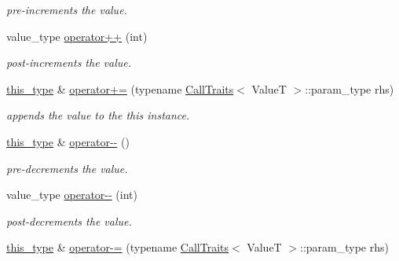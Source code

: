 \begin{DoxyCompactItemize}
\begin{DoxyCompactList}\small\item\em pre-\/increments the value. \end{DoxyCompactList}\item 
\hypertarget{classhryky_1_1exclusion_1_1_atomic_a5c6f6492d00d72e7a521197b81ffe4f4}{value\-\_\-type \hyperlink{classhryky_1_1exclusion_1_1_atomic_a5c6f6492d00d72e7a521197b81ffe4f4}{operator++} (int)}\label{classhryky_1_1exclusion_1_1_atomic_a5c6f6492d00d72e7a521197b81ffe4f4}

\begin{DoxyCompactList}\small\item\em post-\/increments the value. \end{DoxyCompactList}\item 
\hypertarget{classhryky_1_1exclusion_1_1_atomic_a47dfca877c930888865d7b3edbbb8c9c}{\hyperlink{classhryky_1_1exclusion_1_1_atomic_writing_afc6301af19df5cf042e0cbed6d273b2a}{this\-\_\-type} \& \hyperlink{classhryky_1_1exclusion_1_1_atomic_a47dfca877c930888865d7b3edbbb8c9c}{operator+=} (typename \hyperlink{classhryky_1_1_call_traits}{Call\-Traits}$<$ Value\-T $>$\-::param\-\_\-type rhs)}\label{classhryky_1_1exclusion_1_1_atomic_a47dfca877c930888865d7b3edbbb8c9c}

\begin{DoxyCompactList}\small\item\em appends the value to the this instance. \end{DoxyCompactList}\item 
\hypertarget{classhryky_1_1exclusion_1_1_atomic_aa0c5006bed7305f9ef60685bd8772abe}{\hyperlink{classhryky_1_1exclusion_1_1_atomic_writing_afc6301af19df5cf042e0cbed6d273b2a}{this\-\_\-type} \& \hyperlink{classhryky_1_1exclusion_1_1_atomic_aa0c5006bed7305f9ef60685bd8772abe}{operator-\/-\/} ()}\label{classhryky_1_1exclusion_1_1_atomic_aa0c5006bed7305f9ef60685bd8772abe}

\begin{DoxyCompactList}\small\item\em pre-\/decrements the value. \end{DoxyCompactList}\item 
\hypertarget{classhryky_1_1exclusion_1_1_atomic_aa621bcf7758e9731800e6a5e9fcc99fe}{value\-\_\-type \hyperlink{classhryky_1_1exclusion_1_1_atomic_aa621bcf7758e9731800e6a5e9fcc99fe}{operator-\/-\/} (int)}\label{classhryky_1_1exclusion_1_1_atomic_aa621bcf7758e9731800e6a5e9fcc99fe}

\begin{DoxyCompactList}\small\item\em post-\/decrements the value. \end{DoxyCompactList}\item 
\hypertarget{classhryky_1_1exclusion_1_1_atomic_afede1ba980888cb83c5b42dfa2732a2e}{\hyperlink{classhryky_1_1exclusion_1_1_atomic_writing_afc6301af19df5cf042e0cbed6d273b2a}{this\-\_\-type} \& \hyperlink{classhryky_1_1exclusion_1_1_atomic_afede1ba980888cb83c5b42dfa2732a2e}{operator-\/=} (typename \hyperlink{classhryky_1_1_call_traits}{Call\-Traits}$<$ Value\-T $>$\-::param\-\_\-type rhs)}\label{classhryky_1_1exclusion_1_1_atomic_afede1ba980888cb83c5b42dfa2732a2e}


\end{DoxyCompactItemize}
